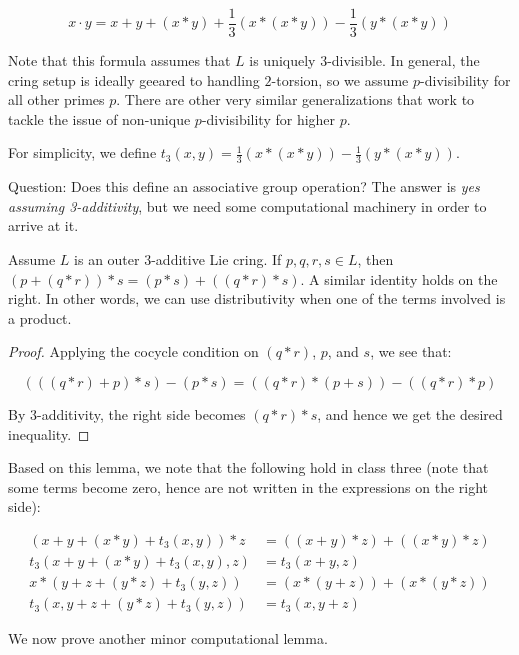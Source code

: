\documentclass[10pt]{amsart}
\begin{document}
$$x \cdot y = x + y + (x * y) + \frac{1}{3}(x * (x * y)) - \frac{1}{3}(y * (x * y))$$

Note that this formula assumes that $L$ is uniquely $3$-divisible. In
general, the cring setup is ideally geeared to handling $2$-torsion,
so we assume $p$-divisibility for all other primes $p$. There are
other very similar generalizations that work to tackle the issue of
non-unique $p$-divisibility for higher $p$.

For simplicity, we define $t_3(x,y) = \frac{1}{3}(x * (x * y)) -
\frac{1}{3}(y * (x * y))$.

Question: Does this define an associative group operation? The answer
is {\em yes assuming 3-additivity}, but we need some computational
machinery in order to arrive at it.

\begin{lemma}\label{lemma:distprod}
  Assume $L$ is an outer $3$-additive Lie cring. If $p,q,r,s \in L$, then
  $(p + (q * r)) * s = (p * s) + ((q * r) * s)$. A similar identity
  holds on the right. In other words, we can use distributivity when
  one of the terms involved is a product.
\end{lemma}

\begin{proof}
  Applying the cocycle condition on $(q * r)$, $p$, and $s$, we see
  that:

  $$(((q * r) + p) * s) - (p * s) = ((q * r) * (p + s)) -  ((q * r) * p)$$

  By $3$-additivity, the right side becomes $(q * r) * s$, and hence
  we get the desired inequality.
\end{proof}

Based on this lemma, we note that the following hold in class three
(note that some terms become zero, hence are not written in the
expressions on the right side):

\begin{align*}
  (x + y + (x * y) + t_3(x,y)) * z & = ((x + y) * z) + ((x * y) * z) \tag{T1}\\
  t_3(x + y + (x * y) + t_3(x,y),z) & = t_3(x + y,z) \tag{T2}\\
  x * (y + z + (y * z) + t_3(y,z)) & = (x * (y + z)) + (x * (y * z)) \tag{T3}\\
  t_3(x,y + z + (y * z) + t_3(y,z)) & = t_3(x,y + z) \tag{T4}
\end{align*}

We now prove another minor computational lemma.
\end{document}
